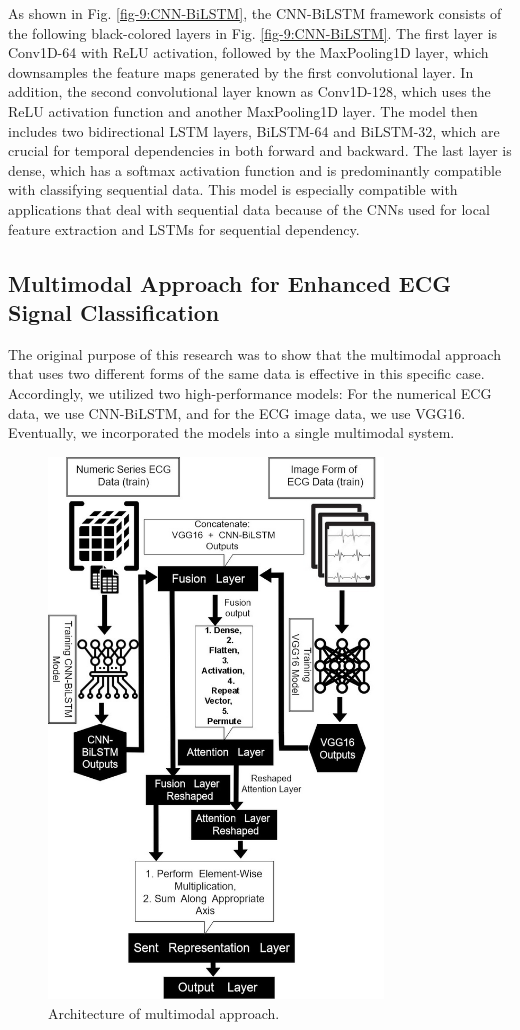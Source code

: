 \documentclass[conference]{IEEEtran}
\begin{document}
As shown in Fig. \ref{fig-9:CNN-BiLSTM}, the CNN-BiLSTM framework consists of the following black-colored layers in Fig. \ref{fig-9:CNN-BiLSTM}. The first layer is Conv1D-64 with ReLU activation, followed by the MaxPooling1D layer, which downsamples the feature maps generated by the first convolutional layer. In addition, the second convolutional layer known as Conv1D-128, which uses the ReLU activation function and another MaxPooling1D layer. The model then includes two bidirectional LSTM layers, BiLSTM-64 and BiLSTM-32, which are crucial for temporal dependencies in both forward and backward. The last layer is dense, which has a softmax activation function and is predominantly compatible with classifying sequential data. This model is especially compatible with applications that deal with sequential data because of the CNNs used for local feature extraction and LSTMs for sequential dependency.

\subsection{Multimodal Approach for Enhanced ECG Signal Classification}
The original purpose of this research was to show that the multimodal approach that uses two different forms of the same data is effective in this specific case. Accordingly, we utilized two high-performance models: For the numerical ECG data, we use CNN-BiLSTM, and for the ECG image data, we use VGG16. Eventually, we incorporated the models into a single multimodal system.


\begin{figure}[htbp]
\centerline{\includegraphics[width=3.5in]{10-Multi-Model.jpg}}
\caption{Architecture of multimodal approach.}
\label{fig-10:multimodal}
\end{figure}
 
\end{document}
